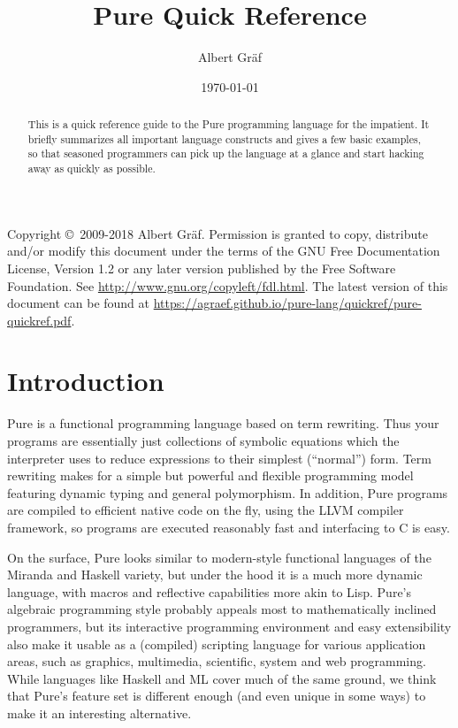\documentclass[a4paper,12pt]{article}
\title{\LARGE\usefont{OT1}{phv}{bc}{n} Pure Quick Reference}
\author{\large\usefont{OT1}{phv}{m}{n} Albert Gr\"af}
\date{\small\usefont{OT1}{phv}{mc}{n}\today}
\begin{document}
\maketitle

\begin{abstract}
This is a quick reference guide to the Pure programming language for the impatient. It briefly summarizes all important language constructs and gives a few basic examples, so that seasoned programmers can pick up the language at a glance and start hacking away as quickly as possible.
\end{abstract}

{\noindent\footnotesize Copyright \copyright\ 2009-2018 Albert Gr\"af. Permission is granted to copy, distribute and/or modify this document under the terms of the GNU Free Documentation License, Version 1.2 or any later version published by the Free Software Foundation. See \url{http://www.gnu.org/copyleft/fdl.html}. The latest version of this document can be found at \url{https://agraef.github.io/pure-lang/quickref/pure-quickref.pdf}.}

\tableofcontents


\section{Introduction}
\label{Introduction}

Pure is a functional programming language based on term rewriting. Thus your programs are essentially just collections of symbolic equations which the interpreter uses to reduce expressions to their simplest (``normal'') form. Term rewriting makes for a simple but powerful and flexible programming model featuring dynamic typing and general polymorphism. In addition, Pure programs are compiled to efficient native code on the fly, using the LLVM compiler framework, so programs are executed reasonably fast and interfacing to C is easy.

On the surface, Pure looks similar to modern-style functional languages of the Miranda and Haskell variety, but under the hood it is a much more dynamic language, with macros and reflective capabilities more akin to Lisp. Pure's algebraic programming style probably appeals most to mathematically inclined programmers, but its interactive programming environment and easy extensibility also make it usable as a (compiled) scripting language for various application areas, such as graphics, multimedia, scien\-ti\-fic, system and web programming. While languages like Haskell and ML cover much of the same ground, we think that Pure's feature set is different enough (and even unique in some ways) to make it an interesting alternative.
\end{document}
